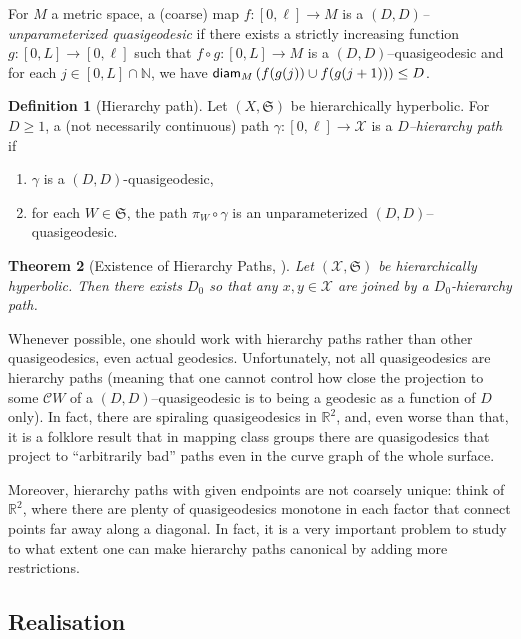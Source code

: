 \documentclass[11pt,oneside]{amsart}
\newtheorem{thm}{Theorem}[section]
\theoremstyle{definition}
\newtheorem{defn}[thm]{Definition}
\DeclareMathOperator{\diam}{\textup{\textsf{diam}}}
\newcommand{\field}[1]{\mathbb{#1}}
\newcommand{\naturals}{\ensuremath{\field{N}}}
\newcommand{\co}{\colon}
\newcommand{\cuco}[1]{{\mathcal #1}}
\newcommand{\fontact}{{\mathcal C}}
\begin{document}
For $M$ a metric space, a (coarse) map $f\co[0,\ell]\to M$ is a
\emph{$(D,D)$--unparameterized quasigeodesic} if there exists a
strictly increasing function $g\co[0,L]\to[0,\ell]$ such that $f\circ
g\co[0,L]\to M$ is a $(D,D)$--quasigeodesic and for each
$j\in[0,L]\cap\naturals$, we have $\diam_M\left(f(g(j))\cup
f(g(j+1))\right)\leq D$.

\begin{defn}[Hierarchy path]\label{defn:hierarchy_path}
Let $(X,\mathfrak S)$ be hierarchically hyperbolic. For $D\geq 1$, a (not necessarily continuous) path $\gamma\co[0,\ell]\to\cuco X$ is a \emph{$D$--hierarchy path} if
 \begin{enumerate}
  \item $\gamma$ is a $(D,D)$-quasigeodesic,
  \item for each $W\in\mathfrak S$, the path $\pi_W\circ\gamma$ is an unparameterized $(D,D)$--quasigeodesic.
\end{enumerate}
\end{defn}



\begin{thm}[{Existence of Hierarchy Paths, \cite[Theorem 4.4]{HHS2}}]\label{thm:monotone_hierarchy_paths}
Let $(\cuco X,\mathfrak S)$ be hierarchically hyperbolic. Then there exists $D_0$ so that any $x,y\in\cuco X$ are joined by a $D_0$-hierarchy path. 
\end{thm}

Whenever possible, one should work with hierarchy paths rather than other quasigeodesics, even actual geodesics. Unfortunately, not all quasigeodesics are hierarchy paths (meaning that one cannot control how close the projection to some $\fontact W$ of a $(D,D)$--quasigeodesic is to being a geodesic as a function of $D$ only). In fact, there are spiraling quasigeodesics in $\mathbb R^2$, and, even worse than that, it is a folklore result that in mapping class groups there are quasigodesics that project to ``arbitrarily bad'' paths even in the curve graph of the whole surface.

Moreover, hierarchy paths with given endpoints are not coarsely unique: think of $\mathbb R^2$, where there are plenty of quasigeodesics monotone in each factor that connect points far away along a diagonal. In fact, it is a very important problem to study to what extent one can make hierarchy paths canonical by adding more restrictions.

\subsection{Realisation}
\end{document}

